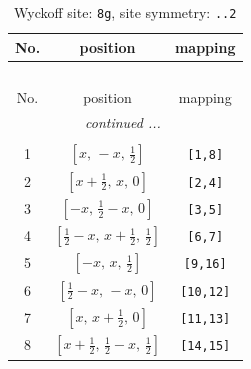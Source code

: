 \documentclass[fleqn,8pt]{jsarticle}
\begin{document}
\renewcommand{\arraystretch}{1.2}
\begin{longtable}{ccc}
\caption{Wyckoff site: {\tt 8g}, site symmetry: {\tt ..2}}
 \\
 \hline \hline
No. & position & mapping \\ \hline \endfirsthead

\multicolumn{2}{l}{\tablename\ \thetable{}} \\
 \hline \hline
No. & position & mapping \\ \hline \endhead

 \hline \hline
\multicolumn{2}{r}{\footnotesize\it continued ...} \\ \endfoot

 \hline \hline
\multicolumn{2}{r}{} \\ \endlastfoot

1 & $\left[ x,\, - x,\, \frac{1}{2} \right]$ & {\tt [1,8]} \\ \hline
2 & $\left[ x + \frac{1}{2},\, x,\, 0 \right]$ & {\tt [2,4]} \\ \hline
3 & $\left[ - x,\, \frac{1}{2} - x,\, 0 \right]$ & {\tt [3,5]} \\ \hline
4 & $\left[ \frac{1}{2} - x,\, x + \frac{1}{2},\, \frac{1}{2} \right]$ & {\tt [6,7]} \\ \hline
5 & $\left[ - x,\, x,\, \frac{1}{2} \right]$ & {\tt [9,16]} \\ \hline
6 & $\left[ \frac{1}{2} - x,\, - x,\, 0 \right]$ & {\tt [10,12]} \\ \hline
7 & $\left[ x,\, x + \frac{1}{2},\, 0 \right]$ & {\tt [11,13]} \\ \hline
8 & $\left[ x + \frac{1}{2},\, \frac{1}{2} - x,\, \frac{1}{2} \right]$ & {\tt [14,15]} \\
\end{longtable}
\renewcommand{\arraystretch}{1.2}
\end{document}
